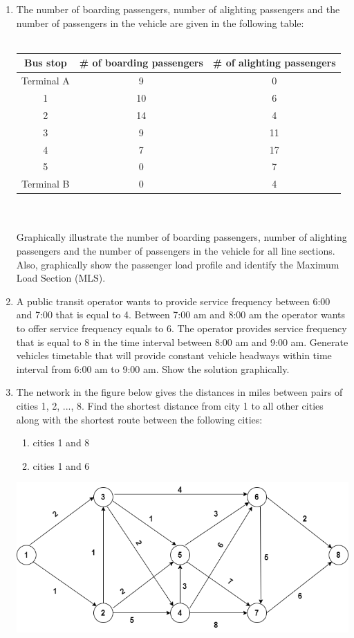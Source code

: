 \begin{enumerate}
\begin{center}
	\end{center}
	\item The number of boarding passengers, number of alighting passengers and the number of passengers in the vehicle are given in the following table:\\\\
	\begin{tabular}{c | c | c}
		\textbf{Bus stop} & \textbf{\# of boarding passengers} & \textbf{\# of alighting passengers} \\
		\hline
		Terminal A & 9 & 0\\
		1 & 10 & 6\\
		2 & 14 & 4\\
		3 & 9 & 11\\
		4 & 7 & 17\\
		5 & 0 & 7\\
		Terminal B & 0 & 4\\
		\hline
	\end{tabular}\\\\
	Graphically illustrate the number of boarding passengers, number of alighting passengers and the number of passengers in the vehicle for all line sections. Also, graphically show the passenger load profile and identify the Maximum Load Section (MLS).
	\item A public transit operator wants to provide service frequency between 6:00 and 7:00 that is equal to 4. Between 7:00 am and 8:00 am the operator wants to offer service frequency equals to 6. The operator provides service frequency that is equal to 8 in the time interval between 8:00 am and 9:00 am. Generate vehicles timetable that will provide constant vehicle headways within time interval from 6:00 am to 9:00 am. Show the solution graphically.
	\item The network in the figure below gives the distances in miles between pairs of cities 1, 2, ..., 8. Find the shortest distance from city 1 to all other cities along with the shortest route between the following cities:
		\begin{enumerate}
			\item cities  1 and 8
			\item cities 1 and 6 
		\end{enumerate}
	\includegraphics[scale= 0.5] {gfx/shortestPath1.png}

\end{enumerate}

